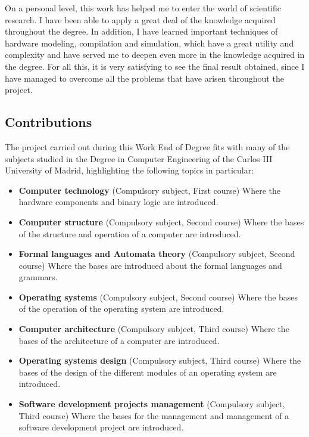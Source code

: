 On a personal level, this work has helped me to enter the world of scientific research. I have been able to apply a great deal of the knowledge acquired throughout the degree. In addition, I have learned important techniques of hardware modeling, compilation and simulation, which have a great utility and complexity and have served me to deepen even more in the knowledge acquired in the degree. For all this, it is very satisfying to see the final result obtained, since I have managed to overcome all the problems that have arisen throughout the project.

\subsection*{Contributions}

The project carried out during this Work End of Degree fits with many of the subjects studied in the Degree in Computer Engineering of the Carlos III University of Madrid, highlighting the following topics in particular:

\begin{itemize}

\item \textbf{Computer technology} (Compulsory subject, First course) Where the hardware components and binary logic are introduced.

\item \textbf{Computer structure} (Compulsory subject, Second course) Where the bases of the structure and operation of a computer are introduced.

\item \textbf{Formal languages and Automata theory} (Compulsory subject, Second course) Where the bases are introduced about the formal languages and grammars.

\item \textbf{Operating systems} (Compulsory subject, Second course) Where the bases of the operation of the operating system are introduced.

\item \textbf{Computer architecture} (Compulsory subject, Third course) Where the bases of the architecture of a computer are introduced.

\item \textbf{Operating systems design} (Compulsory subject, Third course) Where the bases of the design of the different modules of an operating system are introduced.

\item \textbf{Software development projects management} (Compulsory subject, Third course) Where the bases for the management and management of a software development project are introduced.

\end{itemize}

